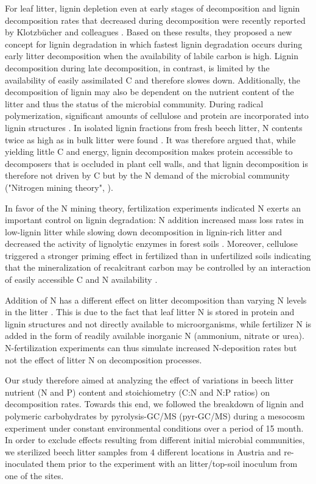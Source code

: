 For leaf litter, lignin depletion even at early stages of decomposition and lignin decomposition rates that decreased during decomposition were recently reported by Klotzbücher and colleagues \cite{Klotzbucher2011}. Based on these results, they proposed a new concept for lignin degradation in which fastest lignin degradation occurs during early litter decomposition when the availability of labile carbon is high. Lignin decomposition during late decomposition, in contrast, is limited by the availability of easily assimilated C and therefore slowes down. Additionally, the decomposition of lignin may also be dependent on the nutrient content of the litter and thus the status of the microbial community. During radical polymerization, significant amounts of cellulose and protein are incorporated into lignin structures \cite{Achyuthan2010}. In isolated lignin fractions from fresh beech litter, N contents twice as high as in bulk litter were found \cite{Dyckmans2002}. It was therefore argued that, while yielding little C and energy, lignin decomposition makes protein accessible to decomposers that is occluded in plant cell walls, and that lignin decomposition is therefore not driven by C but by the N demand of the microbial community ("Nitrogen mining theory", \cite{Craine2007}). 

In favor of the N mining theory, fertilization experiments indicated N exerts an important control on lignin degradation: N addition increased mass loss rates in low-lignin litter while slowing down decomposition in lignin-rich litter \cite{Knorr2005} and decreased the activity of lignolytic enzymes in forest soils \cite{Sinsabaugh2010}. Moreover, cellulose triggered a stronger priming effect in fertilized than in unfertilized soils indicating that the mineralization of recalcitrant carbon may be controlled by an interaction of easily accessible C and N availability \cite{Fontaine2011}.

Addition of N has a different effect on litter decomposition than varying N levels in the litter \cite{Talbot2011}. This is due to the fact that leaf litter N is stored in protein and lignin structures and not directly available to microorganisms, while fertilizer N is added in the form of readily available inorganic N (ammonium, nitrate or urea). N-fertilization experiments can thus simulate increased N-deposition rates but not the effect of litter N on decomposition processes.

Our study therefore aimed at analyzing the effect of variations in beech litter nutrient (N and P) content and stoichiometry (C:N and N:P ratios) on decomposition rates. Towards this end, we followed the breakdown of lignin and polymeric carbohydrates by pyrolysis-GC/MS (pyr-GC/MS) during a mesocosm experiment under constant environmental conditions over a period of 15 month. In order to exclude effects resulting from different initial microbial communities, we sterilized beech litter samples from 4 different locations in Austria and re-inoculated them prior to the experiment with an litter/top-soil inoculum from one of the sites. 

